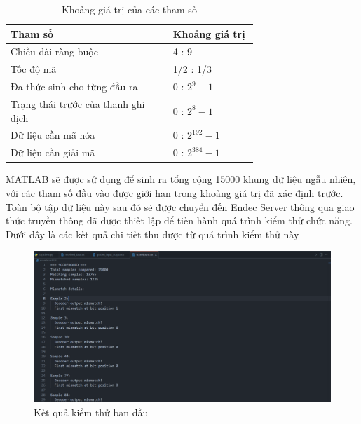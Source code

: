 \documentclass[../DoAn.tex]{subfiles}
\begin{document}
\begin{table}[H]
\centering{}
    \caption{Khoảng giá trị của các tham số}
    \begin{tabular}{|p{0.46\linewidth}|p{0.24\linewidth}|}
        \hline
        \textbf{Tham số} & \textbf{Khoảng giá trị} \\ \hline\hline
        Chiều dài ràng buộc  & 4 : 9          \\ \hline
        Tốc độ mã  & 1/2 : 1/3          \\ \hline
        Đa thức sinh cho từng đầu ra   & 0 : $2^{9} - 1$          \\ \hline
        Trạng thái trước của thanh ghi dịch   & 0 : $2^{8} - 1$          \\ \hline
        Dữ liệu cần mã hóa  & 0 : $2^{192} - 1$ \\ \hline
        Dữ liệu cần giải mã & 0 : $2^{384} - 1$ \\ \hline
        \end{tabular}
        \label{table: Khoảng giá trị của các tham số}
\end{table}

MATLAB sẽ được sử dụng để sinh ra tổng cộng 15000 khung dữ liệu ngẫu nhiên, với các tham số đầu vào được giới hạn trong khoảng giá trị đã xác định trước. Toàn bộ tập dữ liệu này sau đó sẽ được chuyển đến Endec Server thông qua giao thức truyền thông đã được thiết lập để tiến hành quá trình kiểm thử chức năng. Dưới đây là các kết quả chi tiết thu được từ quá trình kiểm thử này

\begin{figure}[H]
    \centering
    \includegraphics[width=\textwidth, height=0.4\textheight, keepaspectratio]{Hinhve/Chuong 4/data_mismatch.png}
    \caption{Kết quả kiểm thử ban đầu}
    \label{fig:Kết quả kiểm thử ban đầu}
\end{figure}
\end{document}
